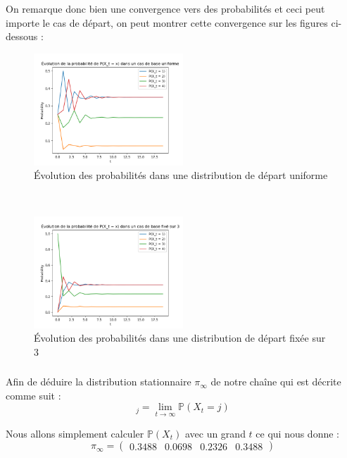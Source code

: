 On remarque donc bien une convergence vers des probabilités et ceci peut importe le cas de départ, on peut montrer cette convergence sur les figures ci-dessous :
\begin{figure}[h!]
  \centering
  \includegraphics[width=0.5\textwidth]{figs/evo_unif.png}
  \caption{Évolution des probabilités dans une distribution de départ uniforme}
\end{figure}
\\
\begin{figure}[h!]
  \centering
  \includegraphics[width=0.5\textwidth]{figs/evo_fixed.png}
  \caption{Évolution des probabilités dans une distribution de départ fixée sur 3}
\end{figure}

\subsubsection{}

Afin de déduire la distribution stationnaire $\pi_{\infty}$ de notre chaîne qui est décrite comme suit :
\begin{equation*}
  [\pi_\infty]_j = \lim_{t \rightarrow \infty} \mathbb{P}(X_t = j)
\end{equation*}

Nous allons simplement calculer $\mathbb{P}(X_t)$ avec un grand $t$ ce qui nous donne :
\begin{equation*}
  \pi_{\infty} = 
  \begin{pmatrix}
    0.3488 & 0.0698 & 0.2326 & 0.3488
  \end{pmatrix}
\end{equation*}